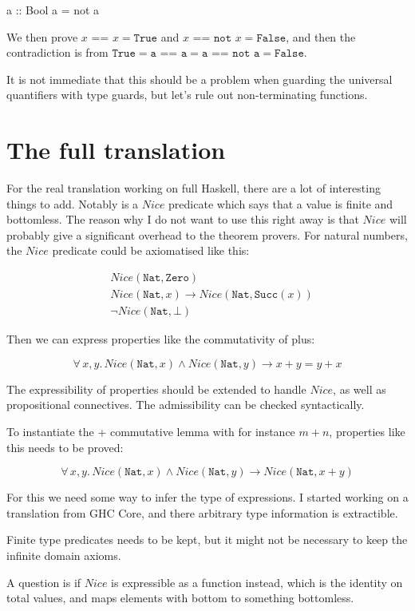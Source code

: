 \documentclass{article}
\newcommand\hs[1]{\texttt{#1}}
\newcommand\faa[2]{\forall \, #1 , #2 . \,}
\newcommand\w[0]{\,\,}
\begin{document}
\begin{code}
a :: Bool
a = not a
\end{code}

We then prove $x \w \hs{==} \w x = \hs{True}$ and $x \w \hs{==} \w \hs{not} \w x = \hs{False}$, and
then the contradiction is from $\hs{True} = \hs{a == a} = \hs{a == not a} = \hs{False}$.

It is not immediate that this should be a problem when guarding the
universal quantifiers with type guards, but let's rule out non-terminating functions.

\section*{The full translation}

For the real translation working on full Haskell, there are a lot of
interesting things to add. Notably is a $Nice$ predicate which says
that a value is finite and bottomless. The reason why I do not want to
use this right away is that $Nice$ will probably give a significant
overhead to the theorem provers. For natural numbers, the $Nice$
predicate could be axiomatised like this:

\begin{align*}
& Nice(\hs{Nat},\hs{Zero}) \\
& Nice(\hs{Nat},x) \rightarrow Nice(\hs{Nat},\hs{Succ}(x)) \\
& \neg Nice(\hs{Nat},\bot)
\end{align*}

Then we can express properties like the commutativity of plus:

$$\faa{x}{y} Nice(\hs{Nat},x) \wedge Nice(\hs{Nat},y) \rightarrow x + y = y + x$$

The expressibility of properties should be extended to handle $Nice$,
as well as propositional connectives. The admissibility can be checked syntactically.

To instantiate the + commutative lemma with for instance $m + n$, properties like this
needs to be proved:

$$\faa{x}{y} Nice(\hs{Nat},x) \wedge Nice(\hs{Nat},y) \rightarrow Nice(\hs{Nat},x + y)$$

For this we need some way to infer the type of expressions. I started
working on a translation from GHC Core, and there arbitrary type
information is extractible.

Finite type predicates needs to be kept, but it might not be necessary
to keep the infinite domain axioms.

A question is if $Nice$ is expressible as a function instead, which is
the identity on total values, and maps elements with bottom to
something bottomless.
\end{document}
